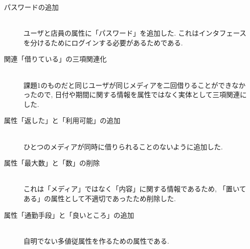 \documentclass{jarticle}
\begin{document}
\begin{description}
\item[パスワードの追加] \leavevmode \\
ユーザと店員の属性に「パスワード」を追加した. これはインタフェースを分けるためにログインする必要があるためである.
\item[関連「借りている」の三項関連化] \leavevmode \\
課題1のものだと同じユーザが同じメディアを二回借りることができなかったので, 
日付や期間に関する情報を属性ではなく実体として三項関連にした.
\item[属性「返した」と「利用可能」の追加] \leavevmode \\
ひとつのメディアが同時に借りられることのないように追加した.
\item[属性「最大数」と「数」の削除] \leavevmode \\
これは「メディア」ではなく「内容」に関する情報であるため, 「置いてある」の属性として不適切であったため削除した.
\item[属性「通勤手段」と「良いところ」の追加] \leavevmode \\
自明でない多値従属性を作るための属性である.
\end{description}
\end{document}
